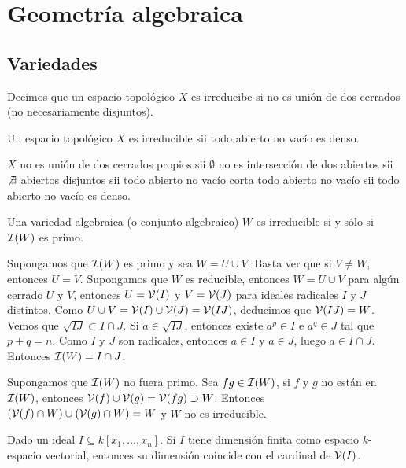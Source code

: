 \documentclass[twoside]{report}
\begin{document}
\chapter{Geometría algebraica}
\section{Variedades}
\begin{defi}
Decimos que un espacio topológico $X$ es irreducibe si no es unión de dos cerrados (no necesariamente disjuntos).
\end{defi}

\begin{propi}
Un espacio topológico $X$ es irreducible sii todo abierto no vacío es denso.
\end{propi}

\begin{dem}
$X$ no es unión de dos cerrados propios sii $\emptyset$ no es intersección de dos abiertos sii $\not\exists$ abiertos disjuntos sii todo abierto no vacío corta todo abierto no vacío sii todo abierto no vacío es denso.
\end{dem}

\begin{propi}
Una variedad algebraica (o conjunto algebraico) $W$ es irreducible si y sólo si $\mathcal{I}(W)$ es primo.
\end{propi}
\begin{dem}
Supongamos que $\mathcal{I}(W)$ es primo y sea $W = U \cup V$. Basta ver que si $V \neq W$, entonces $U = V$.
Supongamos que $W$ es reducible, entonces $W = U \cup V$ para algún cerrado $U$ y $V$, entonces $U=\mathcal{V}(I)$ y $V=\mathcal{V}(J)$ para ideales radicales $I$ y $J$ distintos.
Como $U\cup V = \mathcal{V}(I)\cup\mathcal{V}(J) = \mathcal{V}(IJ)$, deducimos que $\mathcal{V}(IJ)=W$.
Vemos que $\sqrt{IJ}\subset I \cap J$.
Si $a \in \sqrt{IJ}$, entonces existe $a^p \in I$ e $a^q \in J$ tal que $p+q=n$.
Como $I$ y $J$ son radicales, entonces $a \in I$ y $a \in J$, luego $a \in I\cap J$.
Entonces $\mathcal{I}(W) = I \cap J$.

Supongamos que $\mathcal{I}(W)$ no fuera primo. Sea $fg \in \mathcal{I}(W)$, si $f$ y $g$ no están en $\mathcal{I}(W)$, entonces $\mathcal{V}(f)\cup\mathcal{V}(g)=\mathcal{V}(fg)\supset W$. Entonces $(\mathcal{V}(f) \cap W) \cup (\mathcal{V}(g) \cap W) = W$ y $W$ no es irreducible.
\end{dem}

\begin{lemma}
Dado un ideal $I\subseteq k[x_1,\dots, x_n]$. Si $I$ tiene dimensión finita como espacio $k$-espacio vectorial, entonces su dimensión coincide con el cardinal de $\mathcal{V}(I)$. 
\end{lemma}
\end{document}
